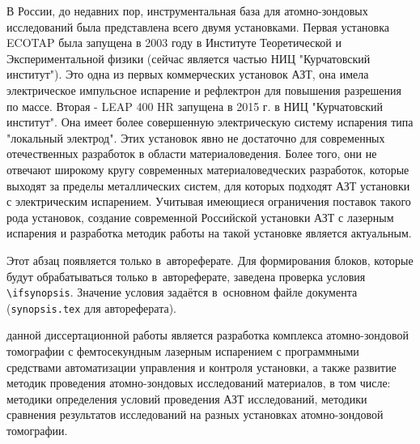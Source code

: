В России, до недавних пор, инструментальная база для атомно-зондовых исследований была представлена всего двумя установками. Первая установка ECOTAP была запущена в 2003 году в Институте Теоретической и Экспериментальной физики (сейчас является частью НИЦ "Курчатовский институт"). Это одна из первых коммерческих установок АЗТ, она имела электрическое импульсное испарение и рефлектрон для повышения разрешения по массе. Вторая - LEAP 400 HR запущена в 2015 г. в НИЦ "Курчатовский институт". Она имеет более совершенную электрическую систему испарения типа "локальный электрод". Этих установок явно не достаточно для современных отечественных разработок в области материаловедения. Более того, они не отвечают широкому кругу современных материаловедческих разработок, которые выходят за пределы металлических систем, для которых подходят АЗТ установки с электрическим испарением. Учитывая имеющиеся ограничения поставок такого рода установок, создание современной Российской установки АЗТ с лазерным испарения и разработка методик работы на такой установке является актуальным.

\ifsynopsis
Этот абзац появляется только в~автореферате.
Для формирования блоков, которые будут обрабатываться только в~автореферате,
заведена проверка условия \verb!\!\verb!ifsynopsis!.
Значение условия задаётся в~основном файле документа (\verb!synopsis.tex! для
автореферата).
\else
\fi


{\aim} данной диссертационной работы является разработка комплекса атомно-зондовой томографии с фемтосекундным лазерным испарением с программными средствами автоматизации управления и контроля установки, а также развитие методик проведения атомно-зондовых исследований материалов, в том числе: методики определения условий проведения АЗТ исследований, методики сравнения результатов исследований на разных установках атомно-зондовой томографии.

